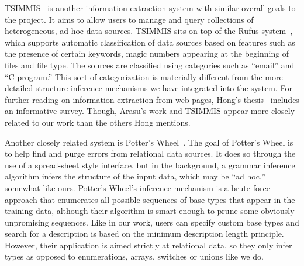 TSIMMIS~\cite{chawathe+:tsimmis} is another information extraction
system with similar overall goals to the \pads{} project.  It aims to
allow users to manage and query collections of heterogeneous, ad hoc
data sources.  TSIMMIS sits on top of the Rufus
system~\cite{shoens+:rufus}, which supports automatic classification
of data sources based on features such as the presence of certain
keywords, magic numbers appearing at the beginning of files and file
type.  The sources are classified using categories such as ``email''
and ``C program.''  This sort of categorization is materially
different from the more detailed structure inference mechanisms we
have integrated into the \pads{} system.  For further reading on
information extraction from web pages, Hong's
thesis~\cite{hong:thesis} includes an informative survey.  Though,
Arasu's work and TSIMMIS appear more closely related to our work than
the others Hong mentions.

Another closely related system is Potter's Wheel~\cite{raman+:potterwheel}.
The goal of Potter's Wheel is to help find and purge errors from
relational data sources.  It does so through the use of a spread-sheet
style interface, but in the background, a grammar inference algorithm
infers the structure of the input data, which may be ``ad hoc,'' 
somewhat like ours.  Potter's Wheel's inference mechanism is a brute-force
approach that enumerates all possible sequences of base types that appear
in the training data, although their algorithm is smart enough to
prune some obviously unpromising sequences.  Like in our work,
users can specify custom base types and search for a description
is based on the minimum description length principle.  However,
their application is aimed
strictly at relational data, so they only infer  types
as opposed to enumerations, arrays, switches or unions like we do.  

